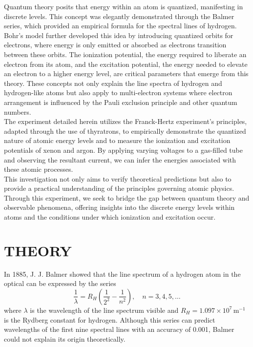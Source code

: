 \documentclass[a4paper,11pt]{article}
\begin{document}
Quantum theory posits that energy within an atom is quantized, manifesting in discrete levels. This concept was elegantly demonstrated through the Balmer series, which provided an empirical formula for the spectral lines of hydrogen. Bohr’s model further developed this idea by introducing quantized orbits for electrons, where energy is only emitted or absorbed as electrons transition between these orbits. The ionization potential, the energy required to liberate an electron from its atom, and the excitation potential, the energy needed to elevate an electron to a higher energy level, are critical parameters that emerge from this theory. These concepts not only explain the line spectra of hydrogen and hydrogen-like atoms but also apply to multi-electron systems where electron arrangement is influenced by the Pauli exclusion principle and other quantum numbers.\\

The experiment detailed herein utilizes the Franck-Hertz experiment's principles, adapted through the use of thyratrons, to empirically demonstrate the quantized nature of atomic energy levels and to measure the ionization and excitation potentials of xenon and argon. By applying varying voltages to a gas-filled tube and observing the resultant current, we can infer the energies associated with these atomic processes.\\

This investigation not only aims to verify theoretical predictions but also to provide a practical understanding of the principles governing atomic physics. Through this experiment, we seek to bridge the gap between quantum theory and observable phenomena, offering insights into the discrete energy levels within atoms and the conditions under which ionization and excitation occur.

\newpage
{}
\section*{\center THEORY}
\label{sec:THEORY}
In 1885, J. J. Balmer showed that the line spectrum of a hydrogen atom in the optical can be expressed by the series
\begin{equation}
\frac{1}{\lambda} = R_{H} \left( \frac{1}{2^2} - \frac{1}{n^2} \right), \quad n = 3, 4, 5, \ldots
\end{equation}
where $\lambda$ is the wavelength of the line spectrum visible and $R_{H} = 1.097 \times 10^7 \, \text{m}^{-1}$ is the Rydberg constant for hydrogen. Although this series can predict wavelengths of the first nine spectral lines with an accuracy of 0.001, Balmer could not explain its origin theoretically.
\end{document}
